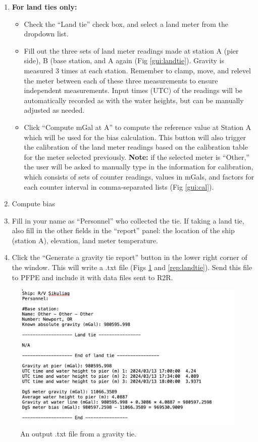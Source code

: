 \documentclass{pfpe-manual}
\begin{document}
\begin{enumerate}
\item \textbf{For land ties only:}
    \begin{itemize}
    \item Check the ``Land tie'' check box, and select a land meter from the dropdown list. 
    \item Fill out the three sets of land meter readings made at station A (pier side), B (base station, and A again (Fig \ref{gui:landtie}). Gravity is measured 3 times at each station. Remember to clamp, move, and relevel the meter between each of these three measurements to ensure independent measurements. Input times (UTC) of the readings will be automatically recorded as with the water heights, but can be manually adjusted as needed.
    \item Click ``Compute mGal at A'' to compute the reference value at Station A which will be used for the bias calculation. This button will also trigger the calibration of the land meter readings based on the calibration table for the meter selected previously. \textbf{Note:} if the selected meter is ``Other,'' the user will be asked to manually type in the information for calibration, which consists of sets of counter readings, values in mGals, and factors for each counter interval in comma-separated lists (Fig \ref{gui:cal}).
    \end{itemize}

\item Compute bias
\item Fill in your name as ``Personnel'' who collected the tie. If taking a land tie, also fill in the other fields in the ``report'' panel: the location of the ship (station A), elevation, land meter temperature.
\item Click the ``Generate a gravity tie report'' button in the lower right corner of the window. This will write a .txt file (Figs \ref{rep:tie} and \ref{rep:landtie}). Send this file to PFPE and include it with data files sent to R2R.
\end{enumerate}

\begin{figure}[ht!]
\centering
\includegraphics[width=\textwidth]{figs/tie_report.png}
\caption{An output .txt file from a gravity tie.}
\label{rep:tie}
\end{figure}
\end{document}
